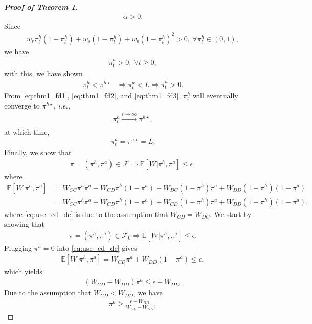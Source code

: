 \documentclass[letterpaper]{article} %
\begin{document}
\begin{proof}[\textbf{Proof of Theorem 1}]
\begin{align}
    \alpha>0.
\end{align}
Since
\begin{align}
    w_r \pi^h_t(1-\pi^h_t) + w_s (1-\pi^h_t) + w_b (1-\pi^h_t)^2>0,\ \forall \pi^h_t\in(0,1),
\end{align}
we have
\begin{align}
    \dot{\pi}^h_t>0,\ \forall t\geq 0,
\end{align}
with this, we have shown
\begin{align}
\pi^h_t<\pi^{h \star}&\Rightarrow\pi^a_t<L\Rightarrow\dot{\pi}^h_t>0. \label{eq:thm1_fd3}
\end{align}
From \eqref{eq:thm1_fd1}, \eqref{eq:thm1_fd2}, and \eqref{eq:thm1_fd3}, $\pi^h_t$ will eventually converge to $\pi^{h \star}$, \textit{i.e.,}
\begin{align}
    \pi^h_t\xrightarrow[]{t\rightarrow\infty}\pi^{h \star},
\end{align}
at which time,
\begin{align}
    \pi^a_t=\pi^{a \star}=L.
\end{align}
Finally, we show that
\begin{align}
\label{eq:f_safe}
    \pi=(\pi^h,\pi^a)\in\mathcal{F}\Rightarrow\mathbb{E}[W|\pi^h,\pi^a]\leq\epsilon,
\end{align}
where
\begin{align}
    \mathbb{E}[W|\pi^h,\pi^a]&=W_{CC}\pi^h\pi^a+W_{CD}\pi^h(1-\pi^a)+W_{DC}(1-\pi^h)\pi^a+W_{DD}(1-\pi^h)(1-\pi^a)\\
    &=W_{CC}\pi^h\pi^a+W_{CD}\pi^h(1-\pi^a)+W_{CD}(1-\pi^h)\pi^a+W_{DD}(1-\pi^h)(1-\pi^a), \label{eq:use_cd_dc}
\end{align}
where \eqref{eq:use_cd_dc} is due to the assumption that $W_{CD}=W_{DC}$. We start by showing that
\begin{align}
\label{eq:f0_safe}
    \pi=(\pi^h,\pi^a)\in\mathcal{F}_0\Rightarrow\mathbb{E}[W|\pi^h,\pi^a]\leq\epsilon.
\end{align}
Plugging $\pi^h=0$ into \eqref{eq:use_cd_dc} gives
\begin{align}
    \mathbb{E}[W|\pi^h,\pi^a]=W_{CD}\pi^a+W_{DD}(1-\pi^a)\leq\epsilon,
\end{align}
which yields
\begin{align}
    (W_{CD}-W_{DD})\pi^a\leq\epsilon-W_{DD}.
\end{align}
Due to the assumption that $W_{CD}<W_{DD}$, we have
\begin{align}
    \pi^a\geq \frac{\epsilon-W_{DD}}{W_{CD}-W_{DD}},
\end{align}

\end{proof}
\end{document}
